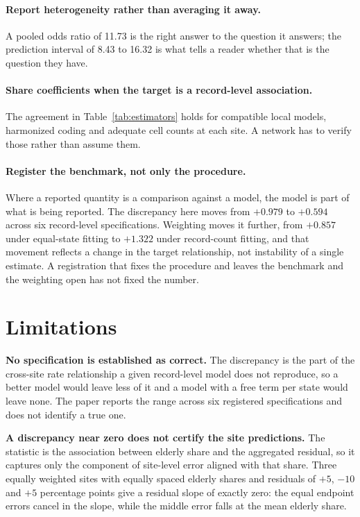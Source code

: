 \documentclass[11pt]{article}
\begin{document}
\paragraph{Report heterogeneity rather than averaging it away.}
A pooled odds ratio of 11.73 is the right answer to the question it
answers; the prediction interval of 8.43 to 16.32 is what tells a
reader whether that is the question they have.

\paragraph{Share coefficients when the target is a record-level
association.}  The agreement in Table~\ref{tab:estimators} holds for
compatible local models, harmonized coding and adequate cell counts at
each site.  A network has to verify those rather than assume them.

\paragraph{Register the benchmark, not only the procedure.}
Where a reported quantity is a comparison against a model, the model is
part of what is being reported.  The discrepancy here moves from
$+0.979$ to $+0.594$ across six record-level specifications.  Weighting
moves it further, from $+0.857$ under equal-state fitting to $+1.322$
under record-count fitting, and that movement reflects a change in the
target relationship, not instability of a single estimate.
A registration that fixes the procedure and leaves the benchmark and
the weighting open has not fixed the number.

\section{Limitations}

\textbf{No specification is established as correct.}  The discrepancy
is the part of the cross-site rate relationship a given record-level
model does not reproduce, so a better model would leave less of it and
a model with a free term per state would leave none.  The paper reports
the range across six registered specifications and does not identify a
true one.

\textbf{A discrepancy near zero does not certify the site
predictions.}  The statistic is the association between elderly share
and the aggregated residual, so it captures only the component of
site-level error aligned with that share.  Three equally weighted sites
with equally spaced elderly shares and residuals of $+5$, $-10$ and
$+5$ percentage points give a residual slope of exactly zero: the equal
endpoint errors cancel in the slope, while the middle error falls at
the mean elderly share.
\end{document}
